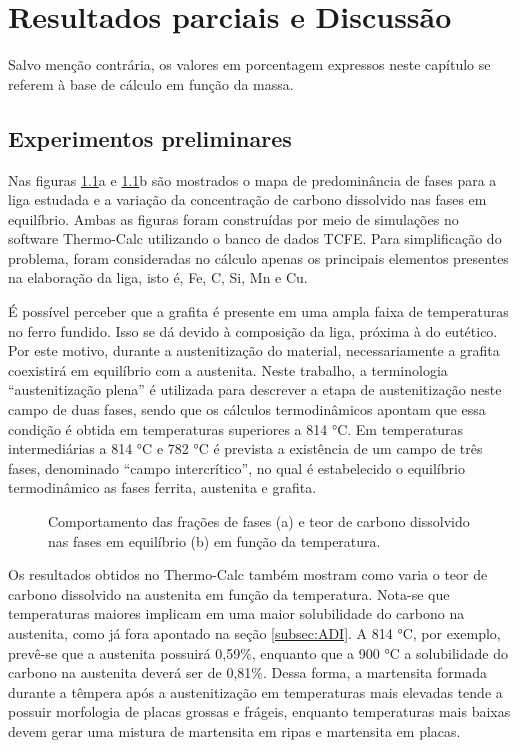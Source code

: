 \chapter{Resultados parciais e Discuss\~{a}o}

Salvo menção contrária, os valores em porcentagem expressos neste capítulo se referem à base de cálculo em função da massa.

\section{Experimentos preliminares}

Nas figuras \ref{fig:thermocalc}a e \ref{fig:thermocalc}b são mostrados o mapa de predominância de fases para a liga estudada e a variação da concentração de carbono dissolvido nas fases em equilíbrio. Ambas as figuras foram construídas por meio de simulações no software Thermo-Calc\textregistered{} utilizando o banco de dados TCFE. Para simplificação do problema, foram consideradas no cálculo apenas os principais elementos presentes na elaboração da liga, isto é, Fe, C, Si, Mn e Cu.

É possível perceber que a grafita é presente em uma ampla faixa de temperaturas no ferro fundido. Isso se dá devido à composição da liga, próxima à do eutético. Por este motivo, durante a austenitização do material, necessariamente a grafita coexistirá em equilíbrio com a austenita. Neste trabalho, a terminologia ``austenitização plena'' é utilizada para descrever a etapa de austenitização neste campo de duas fases, sendo que os cálculos termodinâmicos apontam que essa condição é obtida em temperaturas superiores a 814 °C. Em temperaturas intermediárias a 814 °C e 782 °C é prevista a existência de um campo de três fases, denominado ``campo intercrítico'', no qual é estabelecido o equilíbrio termodinâmico as fases ferrita, austenita e grafita.

\begin{figure}
	\quad
	\caption{Comportamento das frações de fases (a) e teor de carbono dissolvido nas fases em equilíbrio (b) em função da temperatura.}
	\label{fig:thermocalc}
\end{figure}

Os resultados obtidos no Thermo-Calc\textregistered{} também mostram como varia o teor de carbono dissolvido na austenita em função da temperatura. Nota-se que temperaturas maiores implicam em uma maior solubilidade do carbono na austenita, como já fora apontado na seção \ref{subsec:ADI}. A 814 °C, por exemplo, prevê-se que a austenita possuirá 0,59\%, enquanto que a 900 °C a solubilidade do carbono na austenita deverá ser de 0,81\%. Dessa forma, a martensita formada durante a têmpera após a austenitização em temperaturas mais elevadas tende a possuir morfologia de placas grossas e frágeis, enquanto temperaturas mais baixas devem gerar uma mistura de martensita em ripas e martensita em placas.


